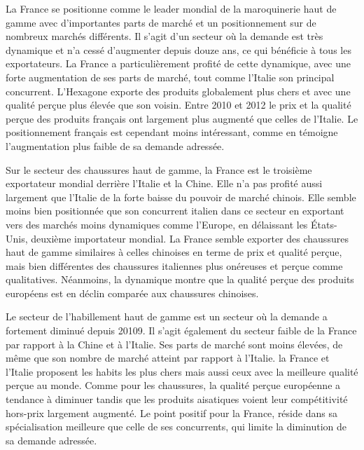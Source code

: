 \documentclass[french,10pt,a4paper]{article}
\begin{document}
La France se positionne comme le leader mondial de la maroquinerie haut de gamme avec d'importantes parts de marché et un positionnement sur de nombreux marchés différents. Il s'agit d'un secteur où la demande est très dynamique et n'a cessé d'augmenter depuis douze ans, ce qui bénéficie à tous les exportateurs. La France a particulièrement profité de cette dynamique, avec une forte augmentation de ses parts de marché, tout comme l'Italie son principal concurrent. L'Hexagone exporte des produits globalement plus chers et avec une qualité perçue plus élevée que son voisin. Entre 2010 et 2012 le prix et la qualité perçue des produits français ont largement plus augmenté que celles de l'Italie. Le positionnement français est cependant moins intéressant, comme en témoigne l'augmentation plus faible de sa demande adressée.

\bigskip

Sur le secteur des chaussures haut de gamme, la France est le troisième exportateur mondial derrière l'Italie et la Chine. Elle n'a pas profité aussi largement que l'Italie de la forte baisse du pouvoir de marché chinois. Elle semble moins bien positionnée que son concurrent italien dans ce secteur en exportant vers des marchés moins dynamiques comme l'Europe, en délaissant les États-Unis, deuxième importateur mondial. La France semble exporter des chaussures haut de gamme similaires à celles chinoises en terme de prix et qualité perçue, mais bien différentes des chaussures italiennes plus onéreuses et perçue comme qualitatives. Néanmoins, la dynamique montre que la qualité perçue des produits européens est en déclin comparée aux chaussures chinoises.

\bigskip

Le secteur de l'habillement haut de gamme est un secteur où la demande a fortement diminué depuis 20109. Il s'agit également du secteur faible de la France par rapport à la Chine et à l'Italie. Ses parts de marché sont moins élevées, de même que son nombre de marché atteint par rapport à l'Italie. la France et l'Italie proposent les habits les plus chers mais aussi ceux avec la meilleure qualité perçue au monde. Comme pour les chaussures, la qualité perçue européenne a tendance à diminuer tandis que les produits aisatiques voient leur compétitivité hors-prix largement augmenté. Le point positif pour la France, réside dans sa spécialisation meilleure que celle de ses concurrents, qui limite la diminution de sa demande adressée. 

\bigskip
\end{document}
